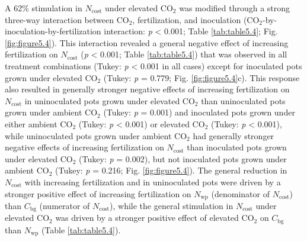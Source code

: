 A 62\% stimulation in $N_\mathrm{cost}$ under elevated CO$_2$ was modified through a strong three-way interaction between CO$_2$, fertilization, and inoculation (CO$_2$-by-inoculation-by-fertilization interaction: \textit{p} < 0.001; Table \ref{tab:table5.4}; Fig. \ref{fig:figure5.4}). This interaction revealed a general negative effect of increasing fertilization on $N_\mathrm{cost}$ (\textit{p} < 0.001; Table \ref{tab:table5.4}) that was observed in all treatment combinations (Tukey: \textit{p} < 0.001 in all cases) except for inoculated pots grown under elevated CO$_2$ (Tukey: \textit{p} = 0.779; Fig. \ref{fig:figure5.4}c). This response also resulted in generally stronger negative effects of increasing fertilization on $N_\mathrm{cost}$ in uninoculated pots grown under elevated CO$_2$ than uninoculated pots grown under ambient CO$_2$ (Tukey: \textit{p} = 0.001) and inoculated pots grown under either ambient CO$_2$ (Tukey: \textit{p} < 0.001) or elevated CO$_2$ (Tukey: \textit{p} < 0.001), while uninoculated pots grown under ambient CO$_2$ had generally stronger negative effects of increasing fertilization on $N_\mathrm{cost}$ than inoculated pots grown under elevated CO$_2$ (Tukey: \textit{p} = 0.002), but not inoculated pots grown under ambient CO$_2$ (Tukey: \textit{p} = 0.216; Fig. \ref{fig:figure5.4}). The general reduction in $N_\mathrm{cost}$ with increasing fertilization and in uninoculated pots were driven by a stronger positive effect of increasing fertilization on $N_\mathrm{wp}$ (denominator of $N_\mathrm{cost}$) than $C_\mathrm{bg}$ (numerator of $N_\mathrm{cost}$), while the general stimulation in $N_\mathrm{cost}$ under elevated CO$_2$ was driven by a stronger positive effect of elevated CO$_2$ on $C_\mathrm{bg}$ than $N_\mathrm{wp}$ (Table \ref{tab:table5.4}).

